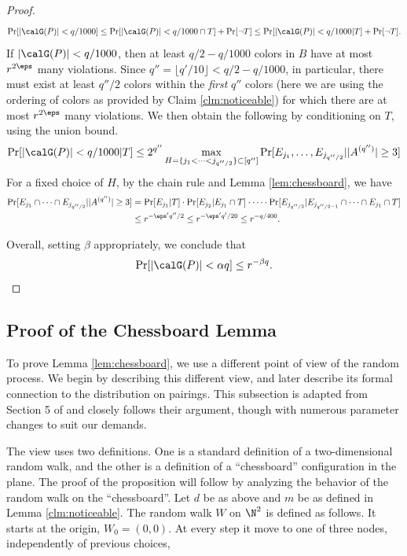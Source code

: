 \documentclass{article}
\begin{document}
\begin{proof}
\[
 \Pr[|\calG(P)| < q/1000] \leq \Pr[|\calG(P)|< q/1000 \cap T] + \Pr[\neg T]\leq \Pr[|\calG(P)|< q/1000 | T] + \Pr[\neg T].
\]
If $|\calG(P)| < q/1000$, then at least $q/2 - q/1000$ colors in $B$ have at most $r^{2\eps}$ many violations. Since $q'' = \lfloor q'/10\rfloor < q/2 - q/1000$, in particular, there must exist at least $q''/2$ colors within the \emph{first} $q''$ colors (here we are using the ordering of colors as provided by Claim \ref{clm:noticeable}) for which there are at most $r^{2\eps}$ many violations. We then obtain the following by conditioning on $T$, using the union bound.
\[
 \Pr[|\calG(P)|< q/1000 | T] \leq 2^{q''} \max_{H = \{j_1<\cdots< j_{q''/2}\} \subset [q'']} \Pr[E_{j_1},\ldots, E_{j_{q''/2}}||A^{(q'')}|\geq 3]
\]
For a fixed choice of $H$, by the chain rule and Lemma \ref{lem:chessboard}, we have
\begin{align*}
\Pr[E_{j_1}\cap \cdots \cap E_{j_{q''/2}}||A^{(q'')}|\geq 3] &= \Pr[E_{j_1}|T]\cdot \Pr[E_{j_2}|E_{j_1}\cap T]\cdot \cdots\cdot  \Pr[E_{j_{q''/2}}|E_{j_{q''/2 - 1}}\cap \cdots \cap E_{j_1} \cap T]\\ &\leq r^{-\eps' q''/2}\leq r^{-\eps' q'/20} \leq r^{-q/400}.
\end{align*}

Overall, setting $\beta$ appropriately, we conclude that 
\[
\Pr[|\calG(P)|< \alpha q] \leq r^{-\beta q}.
\]
\end{proof}

\subsection{Proof of the Chessboard Lemma}\label{subsec:chessboard}

To prove Lemma \ref{lem:chessboard}, we use a different point of view of the random process. We begin by describing this different view, and later describe its formal connection to the distribution on pairings. This subsection is adapted from Section 5 of \cite{DvirMPY12} and closely follows their argument, though with numerous parameter changes to suit our demands.

The view uses two definitions. One is a standard definition of a two-dimensional random
walk, and the other is a definition of a “chessboard” configuration in the plane. The proof of the
proposition will follow by analyzing the behavior of the random walk on the “chessboard”.
Let $d$ be as above and $m$ be as defined in Lemma \ref{clm:noticeable}. The random walk $W$ on $\N^2$
is defined as follows. It
starts at the origin, $W_0 = (0, 0)$. At every step it move to one of three nodes, independently of
previous choices,
\end{document}
